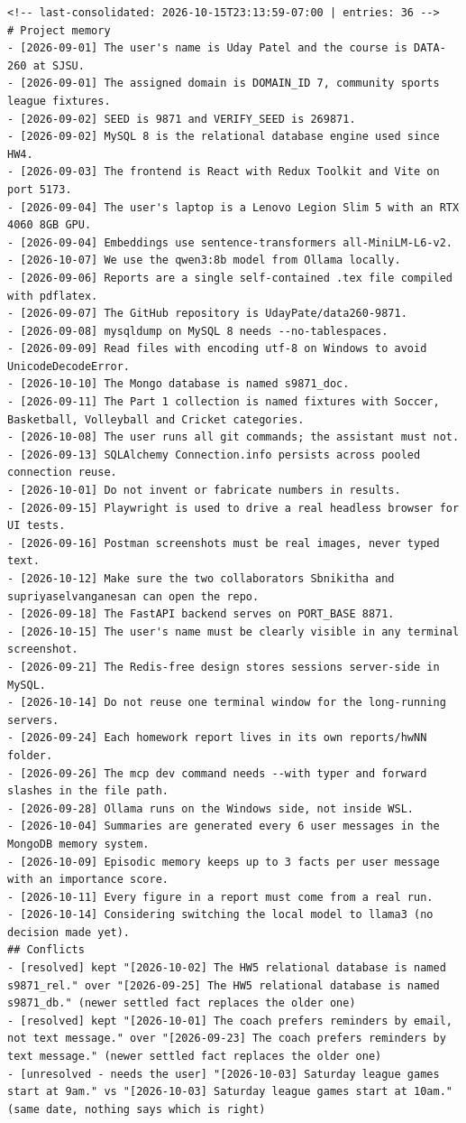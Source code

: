 \documentclass[11pt]{article}
\begin{document}
\begin{lstlisting}
<!-- last-consolidated: 2026-10-15T23:13:59-07:00 | entries: 36 -->
# Project memory
- [2026-09-01] The user's name is Uday Patel and the course is DATA-260 at SJSU.
- [2026-09-01] The assigned domain is DOMAIN_ID 7, community sports league fixtures.
- [2026-09-02] SEED is 9871 and VERIFY_SEED is 269871.
- [2026-09-02] MySQL 8 is the relational database engine used since HW4.
- [2026-09-03] The frontend is React with Redux Toolkit and Vite on port 5173.
- [2026-09-04] The user's laptop is a Lenovo Legion Slim 5 with an RTX 4060 8GB GPU.
- [2026-09-04] Embeddings use sentence-transformers all-MiniLM-L6-v2.
- [2026-10-07] We use the qwen3:8b model from Ollama locally.
- [2026-09-06] Reports are a single self-contained .tex file compiled with pdflatex.
- [2026-09-07] The GitHub repository is UdayPate/data260-9871.
- [2026-09-08] mysqldump on MySQL 8 needs --no-tablespaces.
- [2026-09-09] Read files with encoding utf-8 on Windows to avoid UnicodeDecodeError.
- [2026-10-10] The Mongo database is named s9871_doc.
- [2026-09-11] The Part 1 collection is named fixtures with Soccer, Basketball, Volleyball and Cricket categories.
- [2026-10-08] The user runs all git commands; the assistant must not.
- [2026-09-13] SQLAlchemy Connection.info persists across pooled connection reuse.
- [2026-10-01] Do not invent or fabricate numbers in results.
- [2026-09-15] Playwright is used to drive a real headless browser for UI tests.
- [2026-09-16] Postman screenshots must be real images, never typed text.
- [2026-10-12] Make sure the two collaborators Sbnikitha and supriyaselvanganesan can open the repo.
- [2026-09-18] The FastAPI backend serves on PORT_BASE 8871.
- [2026-10-15] The user's name must be clearly visible in any terminal screenshot.
- [2026-09-21] The Redis-free design stores sessions server-side in MySQL.
- [2026-10-14] Do not reuse one terminal window for the long-running servers.
- [2026-09-24] Each homework report lives in its own reports/hwNN folder.
- [2026-09-26] The mcp dev command needs --with typer and forward slashes in the file path.
- [2026-09-28] Ollama runs on the Windows side, not inside WSL.
- [2026-10-04] Summaries are generated every 6 user messages in the MongoDB memory system.
- [2026-10-09] Episodic memory keeps up to 3 facts per user message with an importance score.
- [2026-10-11] Every figure in a report must come from a real run.
- [2026-10-14] Considering switching the local model to llama3 (no decision made yet).
## Conflicts
- [resolved] kept "[2026-10-02] The HW5 relational database is named s9871_rel." over "[2026-09-25] The HW5 relational database is named s9871_db." (newer settled fact replaces the older one)
- [resolved] kept "[2026-10-01] The coach prefers reminders by email, not text message." over "[2026-09-23] The coach prefers reminders by text message." (newer settled fact replaces the older one)
- [unresolved - needs the user] "[2026-10-03] Saturday league games start at 9am." vs "[2026-10-03] Saturday league games start at 10am." (same date, nothing says which is right)
\end{lstlisting}
\end{document}
